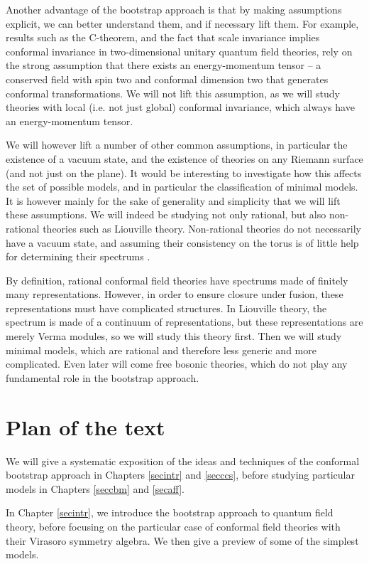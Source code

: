\documentclass[12pt, a4paper, notitlepage, twoside]{report}
\numberwithin{equation}{section}
\theoremstyle{break}
\begin{document}
Another advantage of the bootstrap approach is that by making assumptions explicit, we can better understand them, and if necessary lift them.
For example, results such as the C-theorem, and the fact that scale invariance implies conformal invariance in two-dimensional unitary quantum field theories, rely on the strong assumption that there exists an energy-momentum tensor -- a conserved field with spin two and conformal dimension two that generates conformal transformations.
We will not lift this assumption, as we will study theories with local (i.e.
not just global) conformal invariance, which always have an energy-momentum tensor.

We will however lift a number of other common assumptions, in particular the existence of a vacuum state, and the existence of theories on any Riemann surface (and not just on the plane).
It would be interesting to investigate how this affects the set of possible models, and in particular the classification of minimal models.
It is however mainly for the sake of generality and simplicity that
we will lift these assumptions.
We will indeed be studying not only rational, but also non-rational theories such as Liouville theory.
Non-rational theories do not necessarily have a vacuum state, and assuming their consistency on the torus is of little help for determining their spectrums \cite{rib14c}. 

By definition, rational conformal field theories have spectrums made of finitely many representations.
However, in order to ensure closure under fusion, these representations must have complicated structures.
In Liouville theory, the spectrum is made of a continuum of representations, but these representations are merely Verma modules, so we will study this theory first.
Then we will study minimal models, which are rational and therefore less generic and more complicated.
Even later will come free bosonic theories, which do not play any fundamental role in the bootstrap approach.


\section{Plan of the text \label{secplan}}

We will give a systematic exposition of the ideas and techniques of the conformal bootstrap approach in Chapters \ref{secintr} and \ref{secccs}, before studying particular models in Chapters \ref{seccbm} and \ref{secaff}.

In Chapter \ref{secintr}, we introduce the bootstrap approach to quantum field theory, before focusing on the particular case of conformal field theories with their Virasoro symmetry algebra.
We then give a preview of some of the simplest models.
\end{document}
